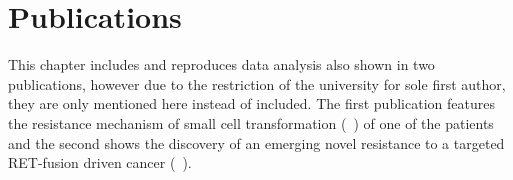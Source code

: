 \section{Publications}
\label{cascade-sec:publication}

This chapter includes and reproduces data analysis also shown in two publications, however due to the restriction of the university for sole first author, they are only mentioned here instead of included. 
The first publication features the resistance mechanism of small cell transformation (\textit{}~\textcite{Burr2019}) of one of the patients and the second shows the discovery of an emerging novel resistance to a targeted RET-fusion driven cancer (\textit{}~\textcite{Solomon2020}).
